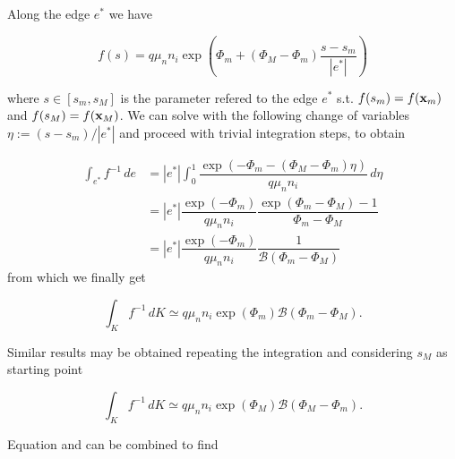 

Along the edge $e^*$ we have

\begin{equation}
f(s) = q \mu_n n_i \exp\left( \Phi_m + (\Phi_M-\Phi_m)\dfrac{s-s_m}{|e^*|} \right)
\end{equation}

where $s \in [s_m,s_M]$ is the parameter refered to the edge $e^*$ s.t. $f(s_m)=f(\mathbf{x}_m)$ and $f(s_M)=f(\mathbf{x}_M)$. We can solve  with the following change of variables $\eta := (s-s_m)/|e^*|$ and proceed with trivial integration steps, to obtain

\begin{align*}
\int_{e^*} f^{-1} \, de & = |e^*| \int_0^1 \dfrac{\exp \left(-\Phi_m - (\Phi_M-\Phi_m)\eta \right)}{q\mu_n n_i} 
 \, d\eta \\
  & = |e^*|\dfrac{\exp (-\Phi_m)}{q\mu_n n_i} \dfrac{\exp ( \Phi_m-\Phi_M)-1}{\Phi_m-\Phi_M} \\
 & =  |e^*|\dfrac{\exp (-\Phi_m)}{q\mu_n n_i} \dfrac{1}{\mathcal{B}(\Phi_m-\Phi_M)}
\end{align*}
from which we finally get

\begin{equation}
\label{eq: finally approzimation 3D to 1D}
\int_{K} f^{-1} \, dK \simeq  q \mu_n n_i \exp(\Phi_m) \mathcal{B}(\Phi_m-\Phi_M).
\end{equation}

Similar results may be obtained repeating the integration and considering $s_M$ as starting point

\begin{equation}
\label{eq: approssimazione sm}
\int_{K} f^{-1} \, dK \simeq  q \mu_n n_i \exp(\Phi_M) \mathcal{B}(\Phi_M-\Phi_m).
\end{equation}

Equation  and  can be combined to find

